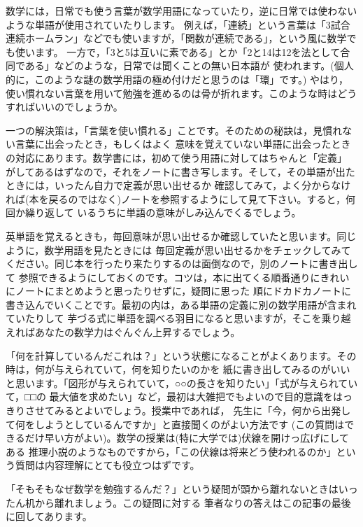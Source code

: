 \documentclass[./main]{subfiles}
\begin{document}

数学には，日常でも使う言葉が数学用語になっていたり，逆に日常では使わないような単語が使用されていたりします。
例えば，「連続」という言葉は「3試合連続ホームラン」などでも使いますが，「関数が連続である」，という風に数学でも使います。
一方で，「3と5は互いに素である」とか「2と14は12を法として合同である」などのような，日常では聞くことの無い日本語が
使われます。(個人的に，このような謎の数学用語の極め付けだと思うのは「環」です。)
やはり，使い慣れない言葉を用いて勉強を進めるのは骨が折れます。このような時はどうすればいいのでしょうか。

一つの解決策は，「言葉を使い慣れる」ことです。そのための秘訣は，見慣れない言葉に出会ったとき，もしくはよく
意味を覚えていない単語に出会ったときの対応にあります。数学書には，初めて使う用語に対してはちゃんと「定義」
がしてあるはずなので，それをノートに書き写します。そして，その単語が出たときには，いったん自力で定義が思い出せるか
確認してみて，よく分からなければ(本を戻るのではなく)ノートを参照するようにして見て下さい。すると，何回か繰り返して
いるうちに単語の意味がしみ込んでくるでしょう。

英単語を覚えるときも，毎回意味が思い出せるか確認していたと思います。同じように，数学用語を見たときには
毎回定義が思い出せるかをチェックしてみてください。同じ本を行ったり来たりするのは面倒なので，別のノートに書き出して
参照できるようにしておくのです。コツは，本に出てくる順番通りにきれいにノートにまとめようと思ったりせずに，疑問に思った
順にドカドカノートに書き込んでいくことです。最初の内は，ある単語の定義に別の数学用語が含まれていたりして
芋づる式に単語を調べる羽目になると思いますが，そこを乗り越えればあなたの数学力はぐんぐん上昇するでしょう。


「何を計算しているんだこれは？」という状態になることがよくあります。その時は，何が与えられていて，何を知りたいのかを
紙に書き出してみるのがいいと思います。「図形が与えられていて，○○の長さを知りたい」「式が与えられていて，□□の
最大値を求めたい」など，最初は大雑把でもよいので目的意識をはっきりさせてみるとよいでしょう。授業中であれば，
先生に「今，何から出発して何をしようとしているんですか」と直接聞くのがよい方法です
(この質問はできるだけ早い方がよい)。数学の授業は(特に大学では)伏線を開けっ広げにしてある
推理小説のようなものですから，「この伏線は将来どう使われるのか」という質問は内容理解にとても役立つはずです。

「そもそもなぜ数学を勉強するんだ？」という疑問が頭から離れないときはいったん机から離れましょう。この疑問に対する
筆者なりの答えはこの記事の最後に回してあります。
\end{document}
